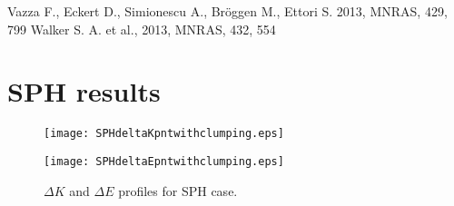 \documentclass[a4paper,fleqn,usenatbib]{mnras}
\begin{document}
{\begin{thebibliography}{}
Vazza F., Eckert D., Simionescu A., Br{\"o}ggen M.,  Ettori S. 2013, MNRAS, 429, 799
Walker S. A. et al., 2013, MNRAS, 432, 554

\end{thebibliography}
}
\appendix



\section{SPH results}
\label{sec:appendix}





\begin{figure*}
\begin{minipage}{8.5cm}
 \texttt{[image: SPHdeltaKpntwithclumping.eps]}
\end{minipage}
\begin{minipage}{8.5cm}
 \texttt{[image: SPHdeltaEpntwithclumping.eps]}
\end{minipage}   
 \caption{ $\Delta K$ and $\Delta E$ profiles for SPH case.}
\label{SphdeltaK}
 \end{figure*}
\end{document}
